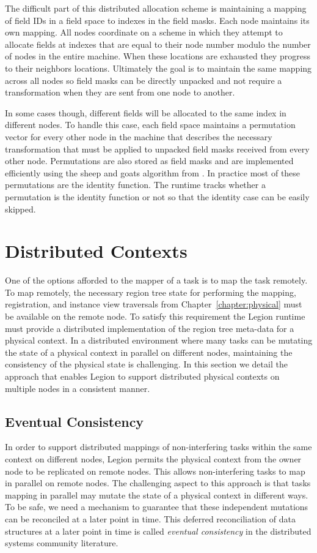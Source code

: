The difficult part of this distributed allocation
scheme is maintaining a mapping of field IDs
in a field space to indexes in the field masks.
Each node maintains its own mapping. All nodes
coordinate on a scheme in which they attempt to
allocate fields at indexes that are equal to their
node number modulo the number of nodes in the entire 
machine. When these locations are exhausted they
progress to their neighbors locations. Ultimately the 
goal is to maintain the same mapping across all nodes
so field masks can be directly unpacked and not
require a transformation when they are sent from
one node to another.

In some cases though, different fields will
be allocated to the same index in different nodes.
To handle this case, each field space maintains
a permutation vector for every other node in the
machine that describes the necessary transformation 
that must be applied to unpacked field masks
received from every other node. Permutations are
also stored as field masks and are implemented
efficiently using the sheep and goats algorithm
from \cite{HackersDelight}. In practice most of
these permutations are the identity function.
The runtime tracks whether a permutation is the
identity function or not so that the identity
case can be easily skipped.


\section{Distributed Contexts}
\label{sec:distctx}
One of the options afforded to the mapper of a
task is to map the task remotely. To map remotely,
the necessary region tree state for performing the
mapping, registration, and instance view traversals
from Chapter~\ref{chapter:physical} must be available
on the remote node. To satisfy this requirement
the Legion runtime must provide a distributed 
implementation of the region tree meta-data for a
physical context. In a distributed environment where
many tasks can be mutating the state of a physical
context in parallel on different nodes, maintaining
the consistency of the physical state is challenging.
In this section we detail the approach that enables
Legion to support distributed physical contexts on
multiple nodes in a consistent manner.

\subsection{Eventual Consistency}
\label{subsec:eventual}
In order to support distributed mappings of non-interfering
tasks within the same context on different nodes, Legion 
permits the physical context from the owner node to be
replicated on remote nodes.  This allows non-interfering
tasks to map in parallel on remote nodes. The challenging
aspect to this approach is that tasks mapping in parallel
may mutate the state of a physical context in different
ways. To be safe, we need a mechanism to guarantee that
these independent mutations can be reconciled at a later
point in time. This deferred reconciliation of data 
structures at a later point in time is called 
{\em eventual consistency} in the distributed systems
community literature.

